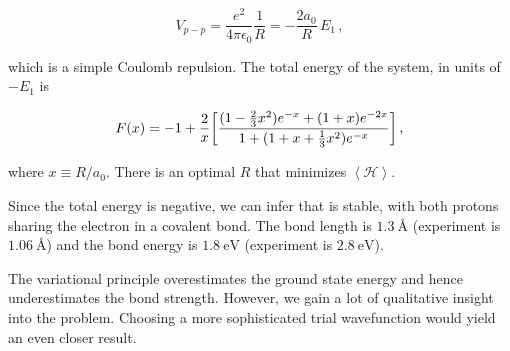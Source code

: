 \documentclass[12pt, titlepage]{article}
\newcommand{\exv}[1]{\left\langle #1 \right\rangle}
\begin{document}
\begin{equation*}
	V_{p-p} = \frac{e^2}{4\pi\epsilon_0}\frac{1}{R} = -\frac{2a_0}{R}\,E_1\,,
\end{equation*}

which is a simple Coulomb repulsion. The total energy of the system, in units of $-E_1$ is

\begin{equation}
	F(x) = -1 + \frac{2}{x}\qty[\frac{(1-\frac{2}{3}x^2)e^{-x} + (1+x)e^{-2x}}{1 + (1 + x + \frac{1}{3}x^2)e^{-x}}] \,,
\end{equation}

where $x \equiv R/a_0$. There is an optimal $R$ that minimizes $\exv{\mathcal{H}}$. 


Since the total energy is negative, we can infer that  is stable, with both protons sharing the electron in a covalent bond. The bond length is $\SI{1.3}{\angstrom}$ (experiment is $\SI{1.06}{\angstrom}$) and the bond energy is $\SI{1.8}{\eV}$ (experiment is $\SI{2.8}{\eV}$).

The variational principle overestimates the ground state energy and hence underestimates the bond strength. However, we gain a lot of qualitative insight into the problem. Choosing a more sophisticated trial wavefunction would yield an even closer result.

 
\end{document}
